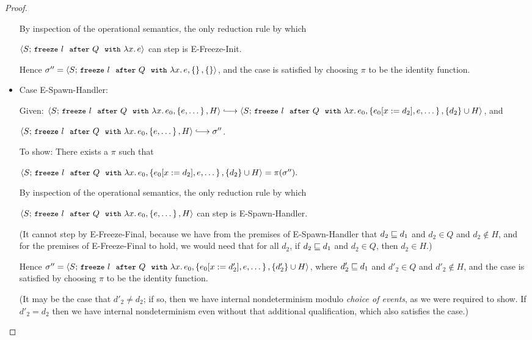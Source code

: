 \begin{proof}
\begin{itemize}
    By inspection of the operational semantics, the only reduction
    rule by which

    $\langle S;\, \mbox{\small{\texttt{freeze}}}~l~~{\mbox{\small{\texttt{after}}}}~Q~~{\mbox{\small{\texttt{with}}}}~\lambda x.\,e \rangle$ can step is {\sc
      E-Freeze-Init}.

    Hence $\sigma'' =
    \langle S;\, \mbox{\small{\texttt{freeze}}}~l~~{\mbox{\small{\texttt{after}}}}~Q~~{\mbox{\small{\texttt{with}}}}~\lambda x.\,e, \left\{\right\}, \left\{\right\} \rangle$,
    and the case is satisfied by choosing $\pi$ to be the identity
    function.

  \item Case {\sc E-Spawn-Handler}:

    Given: $\config{S}{\freezeafterfull{l}{Q}{\lam{x}{e_0}}{\setof{e,
          \dots}}{H}} \parstepsto \\
    \config{S}{\freezeafterfull{l}{Q}{\lam{x}{e_0}}{\setof{\subst{e_0}{x}{d_2},
          e, \dots}} {\{d_2\}\cup H}}$, and

    $\config{S}{\freezeafterfull{l}{Q}{\lam{x}{e_0}}{\setof{e,
          \dots}}{H}} \parstepsto \conf''$.

    To show: There exists a $\pi$ such that

    $\langle S;\, \mbox{\small{\texttt{freeze}}}~l~~{\mbox{\small{\texttt{after}}}}~Q~~{\mbox{\small{\texttt{with}}}}~\lambda x.\,e_0, \left\{e_0[x := d_2],
          e, \dots\right\}, \{d_2\}\cup H \rangle = \pi(\sigma'').$

    By inspection of the operational semantics, the only reduction
    rule by which

    $\langle S;\, \mbox{\small{\texttt{freeze}}}~l~~{\mbox{\small{\texttt{after}}}}~Q~~{\mbox{\small{\texttt{with}}}}~\lambda x.\,e_0, \left\{e,
          \dots\right\}, H \rangle$ can step is {\sc E-Spawn-Handler}.

    (It cannot step by {\sc E-Freeze-Final}, because we have from the
    premises of {\sc E-Spawn-Handler} that $d_2 \sqsubseteq d_1$ and $d_2
    \in Q$ and $d_2 \notin H$, and for the premises of {\sc
      E-Freeze-Final} to hold, we would need that for all $d_2$, if
    $d_2 \sqsubseteq d_1$ and $d_2 \in Q$, then $d_2 \in H$.)

    Hence $\sigma'' =
    \langle S;\, \mbox{\small{\texttt{freeze}}}~l~~{\mbox{\small{\texttt{after}}}}~Q~~{\mbox{\small{\texttt{with}}}}~\lambda x.\,e_0, \left\{e_0[x := d'_2],
          e, \dots\right\}, \{d'_2\}\cup H \rangle$, where $d'_2 \sqsubseteq d_1$ and
    $d'_2 \in Q$ and $d'_2 \notin H$, and the case is satisfied by
    choosing $\pi$ to be the identity function.

    (It may be the case that $d'_2 \neq d_2$; if so, then we have
    internal nondeterminism modulo \emph{choice of events}, as we were
    required to show.  If $d'_2 = d_2$ then we have internal
    nondeterminism even without that additional qualification, which
    also satisfies the case.)


\end{itemize}
\end{proof}

